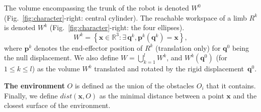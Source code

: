 \medskip
The volume encompassing the trunk of the robot is denoted $W^0$ (Fig.~\ref{fig:character}-right: central cylinder). The reachable workspace of a limb $R^k$ is denoted $W^k$ (Fig.~\ref{fig:character}-right: the four ellipses). 
\begin{equation}
  W^k = \left\{ {\mathbf{x} \in \mathbb{R}^3: \exists \, \mathbf{q}^k, \mathbf{p}^k(\mathbf{q}^k) = \mathbf{x} } \right\},
\end{equation}
where $\mathbf{p}^k$ denotes the end-effector position of $R^k$ (translation only) for $\mathbf{q}^0$ being the null displacement. We also define $W = \bigcup_{k=1}^{l}W^k$, and
$W^k(\mathbf{q}^{0})$ (for $1 \leq k \leq l$) as the volume $W^k$ translated and rotated by the rigid displacement~$\mathbf{q}^{0}$.

\medskip
\textbf{The environment} $O$ is defined as the union of the obstacles $O_i$ that it contains.
Finally, we define $dist(\mathbf{x}, O)$ as the minimal distance between a point $\mathbf{x}$ and the closest surface of the environment.
